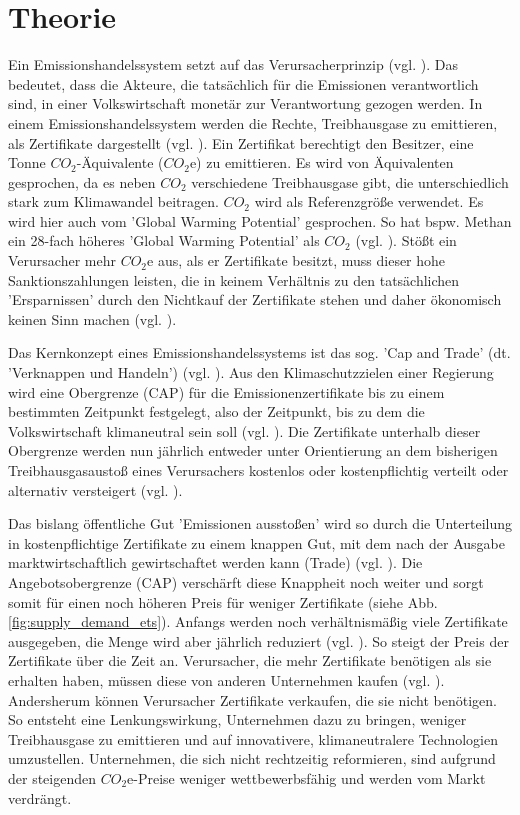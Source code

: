 \chapter{Theorie}

Ein Emissionshandelssystem setzt auf das Verursacherprinzip (vgl. \cite[S. 161]{hubert.2020}).
Das bedeutet, dass die Akteure, die tatsächlich für die Emissionen verantwortlich sind, in einer Volkswirtschaft monetär zur Verantwortung gezogen werden.
In einem Emissionshandelssystem werden die Rechte, Treibhausgase zu emittieren, als Zertifikate dargestellt (vgl. \cite[S. 27]{rabe.2018}).
Ein Zertifikat berechtigt den Besitzer, eine Tonne $CO_2$-Äquivalente ($CO_2$e) zu emittieren.
Es wird von Äquivalenten gesprochen, da es neben $CO_2$ verschiedene Treibhausgase gibt, die unterschiedlich stark zum Klimawandel beitragen. $CO_2$ wird als Referenzgröße verwendet.
Es wird hier auch vom 'Global Warming Potential' gesprochen. So hat bspw. Methan ein 28-fach höheres 'Global Warming Potential' als $CO_2$ (vgl. \cite{epa.2023}).
Stößt ein Verursacher mehr $CO_2$e aus, als er Zertifikate besitzt, muss dieser hohe Sanktionszahlungen leisten, die in keinem Verhältnis zu den tatsächlichen 'Ersparnissen' durch den Nichtkauf der Zertifikate stehen und daher ökonomisch keinen Sinn machen (vgl. \cite[S. 181]{hubert.2020}).

Das Kernkonzept eines Emissionshandelssystems ist das sog. 'Cap and Trade' (dt. 'Verknappen und Handeln') (vgl. \cite[S. 134]{rabe.2018}).
Aus den Klimaschutzzielen einer Regierung wird eine Obergrenze (CAP) für die Emissionenzertifikate bis zu einem bestimmten Zeitpunkt festgelegt, also der Zeitpunkt, bis zu dem die Volkswirtschaft klimaneutral sein soll (vgl. \cite[S. 181]{hubert.2020}).
Die Zertifikate unterhalb dieser Obergrenze werden nun jährlich entweder unter Orientierung an dem bisherigen Treibhausgasaustoß eines Verursachers kostenlos oder kostenpflichtig verteilt oder alternativ versteigert (vgl. \cite[S. 181]{hubert.2020}).

Das bislang öffentliche Gut 'Emissionen ausstoßen' wird so durch die Unterteilung in kostenpflichtige Zertifikate zu einem knappen Gut, mit dem nach der Ausgabe marktwirtschaftlich gewirtschaftet werden kann (Trade) (vgl. \cite[S. 17]{hubert.2020}).
Die Angebotsobergrenze (CAP) verschärft diese Knappheit noch weiter und sorgt somit für einen noch höheren Preis für weniger Zertifikate (siehe Abb. \ref{fig:supply_demand_ets}).
Anfangs werden noch verhältnismäßig viele Zertifikate ausgegeben, die Menge wird aber jährlich reduziert (vgl. \cite[S. 182]{hubert.2020}). So steigt der Preis der Zertifikate über die Zeit an.
Verursacher, die mehr Zertifikate benötigen als sie erhalten haben, müssen diese von anderen Unternehmen kaufen (vgl. \cite[S. 182]{hubert.2020}).
Andersherum können Verursacher Zertifikate verkaufen, die sie nicht benötigen.
So entsteht eine Lenkungswirkung, Unternehmen dazu zu bringen, weniger Treibhausgase zu emittieren und auf innovativere, klimaneutralere Technologien umzustellen.
Unternehmen, die sich nicht rechtzeitig reformieren, sind aufgrund der steigenden $CO_2$e-Preise weniger wettbewerbsfähig und werden vom Markt verdrängt.